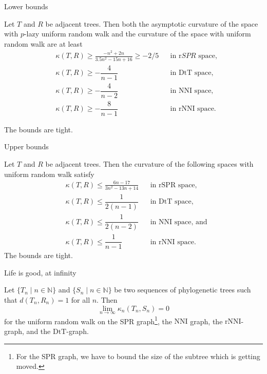 \documentclass{beamer}
\newcommand{\nni}{\mathrm{NNI}}
\newcommand{\rnni}{\mathrm{rNNI}}
\newcommand{\mdts}{\mathrm{DtT}}
\theoremstyle{example}
\begin{document}
\begin{frame}{Lower bounds}
\begin{theorem}
Let $T$ and $R$ be adjacent trees.
Then both the asymptotic curvature of the space with $p$-lazy uniform random walk and the curvature of the space with uniform random walk are at least
\begin{align*}
& \kappa(T,R) \geq \frac{-n^2 + 2n}{3.5n^2 - 15n + 16} \geq -2/5	&& \mbox{in $\mathrm rSPR$ space,}\\
& \kappa(T,R) \geq -\dfrac{4}{n-1}							&& \mbox{in $\mdts$ space,}\\
& \kappa(T,R) \geq -\dfrac{4}{n-2}							&& \mbox{in $\nni$ space,}\\
& \kappa(T,R) \geq -\dfrac{8}{n-1}							&& \mbox{in $\rnni$ space.}
\end{align*}

The bounds are tight.
\end{theorem}
\end{frame}

\begin{frame}{Upper bounds}
\begin{theorem}
Let $T$ and $R$ be adjacent trees.
Then the curvature of the following spaces with uniform random walk satisfy
\begin{align*}
& \kappa(T,R) \leq \frac{6n-17}{3n^2-13n+14}	&& \mbox{in $\mathrm{rSPR}$ space,}\\
& \kappa(T,R) \leq \dfrac{1}{2(n-1)}			&& \mbox{in $\mdts$ space,}\\
& \kappa(T,R) \leq \dfrac{1}{2(n-2)}			&& \mbox{in $\nni$ space, and}\\
& \kappa(T,R) \leq \dfrac{1}{n-1}				&& \mbox{in $\rnni$ space.}
\end{align*}
The bounds are tight.
\end{theorem}
\end{frame}

\begin{frame}{Life is good, at infinity}
\begin{theorem}
Let $\{T_n \mid n \in \mathbb N\}$ and $\{S_n \mid n \in \mathbb N\}$ be two sequences of phylogenetic trees such that $d(T_n,R_n) = 1$ for all $n$.
Then $$\lim_{n \rightarrow \infty} \kappa_n(T_n,S_n) = 0$$ for the uniform random walk on the SPR
graph\footnote{For the SPR graph, we have to bound the size of the subtree which is getting moved.},
the $\nni$ graph, the $\rnni$-graph, and the $\mdts$-graph.
\end{theorem}
\end{frame}
\end{document}
